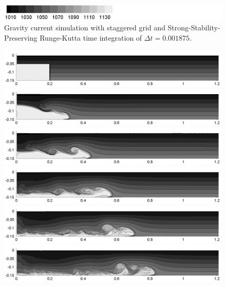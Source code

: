 \begin{figure}[htbp]
\begin{center}
\includegraphics[scale=0.55]{../figures/Staggered/Fig9case/label.png}
    \caption{Gravity current simulation with staggered grid and Strong-Stability-Preserving Runge-Kutta time integration of $\Delta t=0.001875$.}
    \label{fig:060518c-SSPRK35-dt-001875-280-120}
  \end{center}
\end{figure}

\begin{figure}[htbp]
  \begin{center}    \includegraphics[scale=0.55]{../figures/Staggered/Fig9case/060518c-SSPRK35-dt-0075-280-120/01.png}    \includegraphics[scale=0.55]{../figures/Staggered/Fig9case/060518c-SSPRK35-dt-0075-280-120/02.png}
\includegraphics[scale=0.55]{../figures/Staggered/Fig9case/060518c-SSPRK35-dt-0075-280-120/03.png}
\includegraphics[scale=0.55]{../figures/Staggered/Fig9case/060518c-SSPRK35-dt-0075-280-120/04.png}    \includegraphics[scale=0.55]{../figures/Staggered/Fig9case/060518c-SSPRK35-dt-0075-280-120/05.png}
\includegraphics[scale=0.55]{../figures/Staggered/Fig9case/060518c-SSPRK35-dt-0075-280-120/06.png}

\end{center}
\end{figure}
